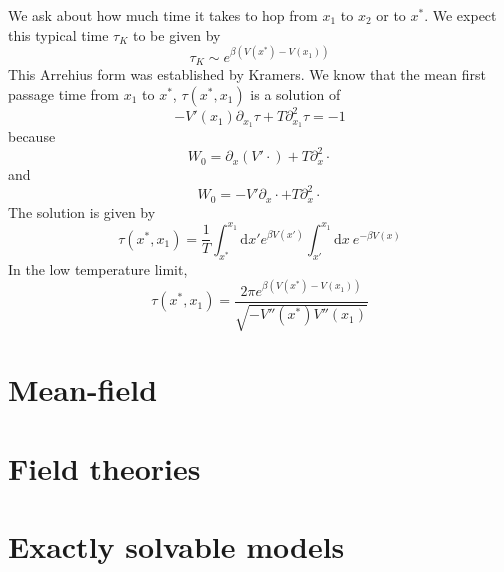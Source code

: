 \documentclass[a4paper]{book}
\theoremstyle{definition}
\theoremstyle{remark}
\begin{document}
We ask about how much time it takes to hop from $x_1$ to $x_2$ or to $x^*$. We expect this typical time $\tau_K$ to be given by 
\begin{equation}
    \tau_K \sim e^{\beta(V(x^*) - V(x_1))}
\end{equation}
This Arrehius form was established by Kramers. We know that the mean first passage time from $x_1$ to $x^*$, $\tau(x^*, x_1)$ is a solution of 
\begin{equation}
    -V'(x_1)\partial_{x_1} \tau + T \partial_{x_1}^2\tau = -1
\end{equation}
because 
\begin{equation}
    W_0 = \partial_x (V'\cdot) + T\partial^2_{x}\cdot
\end{equation}
and  
\begin{equation}
    W_0 = -V'\partial_x \cdot + T\partial^2_{x}\cdot
\end{equation}
The solution is given by 
\begin{equation}
    \tau(x^*, x_1) = \frac{1}{T}\int_{x^*}^{x_1}\text{d}x' e^{\beta V(x')}\int_{x'}^{x_1}\text{d}x ~ e^{-\beta V(x)}
\end{equation}
In the low temperature limit, 
\begin{equation}
    \tau(x^*, x_1) = \frac{2\pi e^{\beta (V(x^*) - V(x_1))}}{\sqrt{-V''(x^*)V''(x_1)}}
\end{equation}
\chapter{Mean-field}

\chapter{Field theories}

\chapter{Exactly solvable models}
\end{document}
